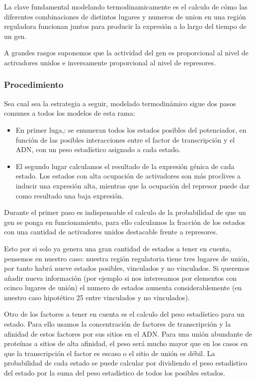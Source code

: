  
 La clave fundamental modelando termodinamicamente es el calculo de cómo las diferentes combinaciones de distintos lugares y numeros de union en una región reguladora funcionan juntos para producir la expresión a lo largo del tiempo de un gen.
 
 A grandes rasgos suponemos que la actividad del gen es proporcional al nivel de activadores unidos e inversamente proporcional al nivel de represores.
 
 \subsubsection{Procedimiento}
 
  Sea cual sea la estrategia a seguir, modelado termodinámico sigue dos pasos comunes a todos los modelos de esta rama:
  \begin{itemize}
  	\item En primer luga,: se enumeran todos los estados posibles del potenciador, en función de las posibles interacciones entre el factor de transcripción y el ADN, con un peso estadístico asignado a cada estado.
  	\item  El segundo lugar calculamos el resultado de la expresión génica de cada estado. Los estados con alta ocupación de activadores son más proclives a inducir una expresión alta, mientras que la ocupación del represor puede dar como resultado una baja expresión.
  \end{itemize}
  
   Durante el primer paso es indispensable el calculo de la probabilidad de que un gen se ponga en funcionamiento, para ello calculamos la fracción de los estados con una cantidad de activadores unidos destacable frente a represores.
   
   Esto por si solo ya genera una gran cantidad de estados a tener en cuenta, pensemos en nuestro caso: nuestra región regulatoria tiene tres lugares de unión, por tanto habrá nueve estados posibles, vinculados y no vinculados. Si queremos añadir nueva información (por ejemplo si nos interesamos por elementos con ccinco lugares de unión) el numero de estados aumenta considerablemente (en nuestro caso hipotético 25 entre vinculados y no vinculados).
 
 
 Otro de los factores a tener en cuenta es el calculo del peso estadístico para un estado. Para ello usamos la concentración de factores de transcripción
 y la afinidad de estos factores por sus sitios en el ADN. Para una unión abundante de proteínas a sitios de alta afinidad, el peso será mucho mayor que en los casos en que la transcripción el factor es escaso o el sitio de unión es débil.
  La probabilidad de cada estado se puede calcular por
 dividiendo el peso estadístico del estado por la suma del peso estadístico de todos los posibles
 estados. 
 
